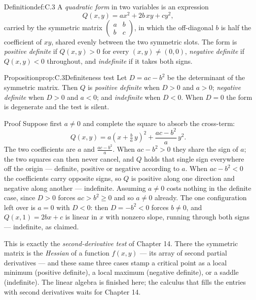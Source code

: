 \documentclass[a4paper,12pt,oneside]{memoir}
\begin{document}
\begin{envdefinition}{Definition}{def:C.3}{}
A \emph{quadratic form} in two variables is an expression \[ Q(x, y) = a x^2 + 2b\,xy + c y^2, \] carried by the symmetric matrix \(\begin{pmatrix} a & b \\ b & c \end{pmatrix}\), in which the off-diagonal \(b\) is half the coefficient of \(xy\), shared evenly between the two symmetric slots. The form is \emph{positive definite} if \(Q(x, y) > 0\) for every \((x, y) \neq (0, 0)\), \emph{negative definite} if \(Q(x, y) < 0\) throughout, and \emph{indefinite} if it takes both signs.
\end{envdefinition}
\begin{envproposition}{Proposition}{prop:C.3}{Definiteness test}
Let \(D = ac - b^2\) be the determinant of the symmetric matrix. Then \(Q\) is \emph{positive definite} when \(D > 0\) and \(a > 0\); \emph{negative definite} when \(D > 0\) and \(a < 0\); and \emph{indefinite} when \(D < 0\). When \(D = 0\) the form is degenerate and the test is silent.
\end{envproposition}
\begin{envproof}{Proof}{}{}
Suppose first \(a \neq 0\) and complete the square to absorb the cross-term: \[ Q(x, y) = a\left(x + \tfrac{b}{a}\,y\right)^2 + \frac{ac - b^2}{a}\,y^2. \] The two coefficients are \(a\) and \(\tfrac{ac - b^2}{a}\). When \(ac - b^2 > 0\) they share the sign of \(a\); the two squares can then never cancel, and \(Q\) holds that single sign everywhere off the origin — definite, positive or negative according to \(a\). When \(ac - b^2 < 0\) the coefficients carry opposite signs, so \(Q\) is positive along one direction and negative along another — indefinite. Assuming \(a \neq 0\) costs nothing in the definite case, since \(D > 0\) forces \(ac > b^2 \ge 0\) and so \(a \neq 0\) already. The one configuration left over is \(a = 0\) with \(D < 0\): then \(D = -b^2 < 0\) forces \(b \neq 0\), and \(Q(x, 1) = 2bx + c\) is linear in \(x\) with nonzero slope, running through both signs — indefinite, as claimed. \qedmark
\end{envproof}
This is exactly the \emph{second-derivative test} of Chapter 14. There the symmetric matrix is the \emph{Hessian} of a function \(f(x, y)\) — its array of second partial derivatives — and these same three cases stamp a critical point as a local minimum (positive definite), a local maximum (negative definite), or a saddle (indefinite). The linear algebra is finished here; the calculus that fills the entries with second derivatives waits for Chapter 14.
\end{document}
